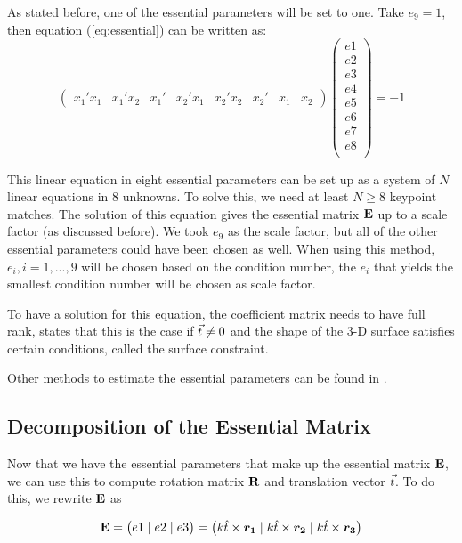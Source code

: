 As stated before, one of the essential parameters will be set to one. Take $e_9 = 1$, then equation (\ref{eq:essential}) can be written as:
\begin{equation}
    \begin{pmatrix}
        x_1'x_1 &
        x_1'x_2 &
        x_1' &
        x_2'x_1 &
        x_2'x_2 &
        x_2' &
        x_1 &
        x_2
    \end{pmatrix}
    \begin{pmatrix}
        e1 \\
        e2 \\
        e3 \\
        e4 \\
        e5 \\
        e6 \\
        e7 \\
        e8 \\
    \end{pmatrix}
    = -1
\end{equation}

This linear equation in eight essential parameters can be set up as a system of $N$ linear equations in 8 unknowns. To solve this, we need at least $N \geq 8$ keypoint matches. The solution of this equation gives the essential matrix $\mathbf{E}$ up to a scale factor (as discussed before). We took $e_9$ as the scale factor, but all of the other essential parameters could have been chosen as well. When using this method, $e_i, i = 1,...,9$ will be chosen based on the condition number, the $e_i$ that yields the smallest condition number will be chosen as scale factor.

To have a solution for this equation, the coefficient matrix needs to have full rank, \cite{tekalp} states that this is the case if $\vec t \neq 0$ and the shape of the 3-D surface satisfies certain conditions, called the surface constraint.

Other methods to estimate the essential parameters can be found in \cite{tekalp}.

\subsection{Decomposition of the Essential Matrix}
Now that we have the essential parameters that make up the essential matrix $\mathbf{E}$, we can use this to compute rotation matrix $\mathbf{R}$ and translation vector $\vec t$. To do this, we rewrite $\mathbf{E}$ as 

\begin{equation} \label{eq:essential2}
    \mathbf{E} = 
    \begin{pmatrix}
        e1 \mid e2 \mid e3
    \end{pmatrix} = 
    \begin{pmatrix}
        k \hat{t} \times \boldsymbol{r_1} \mid
        k \hat{t} \times \boldsymbol{r_2} \mid
        k \hat{t} \times \boldsymbol{r_3} 
    \end{pmatrix}
\end{equation}

